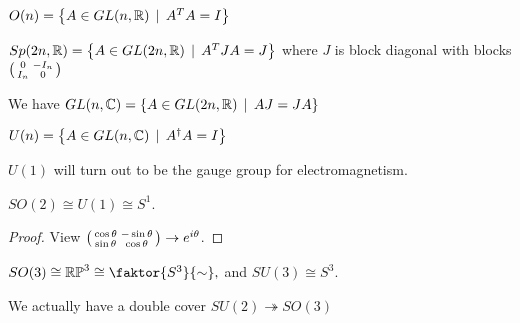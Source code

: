 \documentclass{article}
\begin{document}
\begin{example}
	$O(n) = \left\{ A \in GL(n,\mathbb{R}) \, \mid \, A^T A = I \right\}$
\end{example}

\begin{example}
	$Sp(2n,\mathbb{R}) = \left\{ A \in GL(2n,\mathbb{R}) \, \mid \, A^T J A = J \right\}$ where $J$ is block diagonal with blocks $\begin{psmallmatrix} 0 & -I_n \\ I_n & 0 \end{psmallmatrix}$
\end{example}

\begin{example}
	We have $GL(n,\mathbb{C}) = \left\{ A \in GL(2n,\mathbb{R}) \, \mid \, AJ=JA \right\}$
\end{example}

\begin{example}
	$U(n) = \left\{ A \in GL(n,\mathbb{C}) \, \mid \, A^\dagger A = I \right\}$
\end{example}
\begin{remark}
	$U(1)$ will turn out to be the gauge group for electromagnetism. 	
\end{remark}


\begin{lemma}
\end{lemma}

\begin{lemma}
	$SO(2) \cong U(1) \cong S^1$. 
\end{lemma}
\begin{proof}
	View $\begin{psmallmatrix} \cos \theta & -\sin\theta \\ \sin\theta & \cos\theta \end{psmallmatrix} \to e^{i\theta}$. 
\end{proof}

\begin{lemma}
	$SO(3) \cong \mbb{RP}^3 \cong \faktor{S^3}{\sim},$ and $SU(3) \cong S^3$.
\end{lemma}
\begin{remark}
	We actually have a double cover $SU(2) \twoheadrightarrow SO(3)$
\end{remark}
\end{document}
